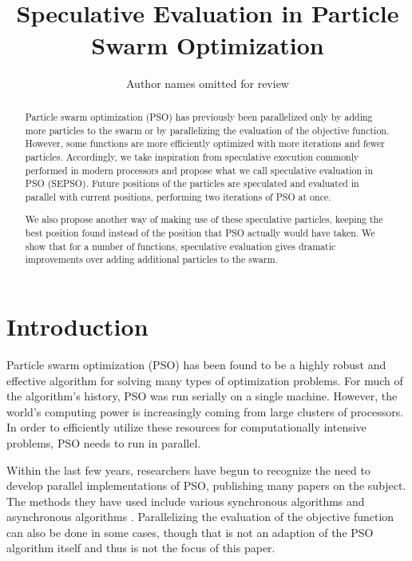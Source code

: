 \documentclass{llncs}
\title{\ \\ \LARGE\bf Speculative Evaluation in Particle Swarm Optimization%
}
\date{}
\author{Author names omitted for review}
\begin{document}
\maketitle

\begin{abstract}

Particle swarm optimization (PSO) has previously been parallelized only by 
adding more particles to the swarm or by parallelizing the evaluation of the
objective function.  However, some functions are more efficiently optimized with more
iterations and fewer particles.  Accordingly, we take inspiration from 
speculative execution commonly performed in modern processors and propose what
we call speculative evaluation in PSO (SEPSO).  Future positions of the particles are
speculated and evaluated in parallel with current positions, performing two
iterations of PSO at once.

We also propose another way of making use of these speculative particles,
keeping the best position found instead of the position that PSO actually would
have taken.  We show that for a number of functions, speculative evaluation
gives dramatic improvements over adding additional particles to the swarm.

\end{abstract}

\section{Introduction}
\label{sec:intro}

Particle swarm optimization (PSO) has been found to be a highly robust and
effective algorithm for solving many types of optimization problems.  For much
of the algorithm's history, PSO was run serially on a single machine.  However,
the world's computing power is increasingly coming from large clusters of
processors.  In order to efficiently utilize these resources for
computationally intensive problems, PSO needs to run in parallel.

Within the last few years, researchers have begun to recognize the need to
develop parallel implementations of PSO, publishing many papers on the subject.
The methods they have used include various synchronous algorithms
\cite{chu-2006-intelligent-parallel-pso,
schutte-2004-parallel-global-optimization-with-pso} and asynchronous algorithms
\cite{venter-2005-parallel-pso-asynchronous-evaluations}.  Parallelizing the
evaluation of the objective function can also be done in some cases, though
that is not an adaption of the PSO algorithm itself and thus is not the focus
of this paper.
\end{document}
